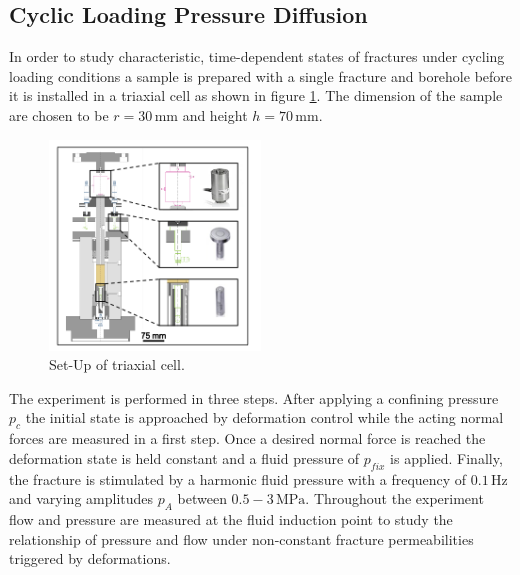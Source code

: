 \subsection{Cyclic Loading Pressure Diffusion}
In order to study characteristic, time-dependent states of fractures under cycling loading conditions a sample is prepared with a single fracture and borehole before it is installed in a triaxial cell as shown in figure \ref{fig:exp_cyclic_pressure_triax}. The dimension of the sample are chosen to be $r = 30 \, \text{mm}$ and height $h = 70 \, \text{mm}$. 
\begin{figure}[!ht]
\begin{center}
\includegraphics[width=0.5\textwidth]{./figures/exp_cyclic_pressure_triax.png}
\end{center}
\caption{Set-Up of triaxial cell.}
\label{fig:exp_cyclic_pressure_triax}
\end{figure}
The experiment is performed in three steps. After applying a confining pressure $p_{c}$ the initial state is approached by deformation control while the acting normal forces are measured in a first step. Once a desired normal force is reached the deformation state is held constant and a fluid pressure of $p_{fix}$ is applied. Finally, the fracture is stimulated by a harmonic fluid pressure with a frequency of $0.1 \, \text{Hz}$ and varying amplitudes $p_A$ between $0.5-3 \, \text{MPa}$. Throughout the experiment flow and pressure are measured at the fluid induction point to study the relationship of pressure and flow under non-constant fracture permeabilities triggered by deformations.
